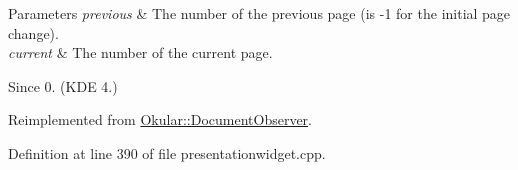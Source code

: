 \begin{DoxyParams}{Parameters}
{\em previous} & The number of the previous page (is {\ttfamily -\/1} for the initial page change). \\
\hline
{\em current} & The number of the current page.\\
\hline
\end{DoxyParams}
\begin{DoxySince}{Since}
0. (K\+D\+E 4.) 
\end{DoxySince}


Reimplemented from \hyperlink{classOkular_1_1DocumentObserver_ae449ca3f3f8aa7dffab61a6b723a1fd8}{Okular\+::\+Document\+Observer}.



Definition at line 390 of file presentationwidget.\+cpp.


